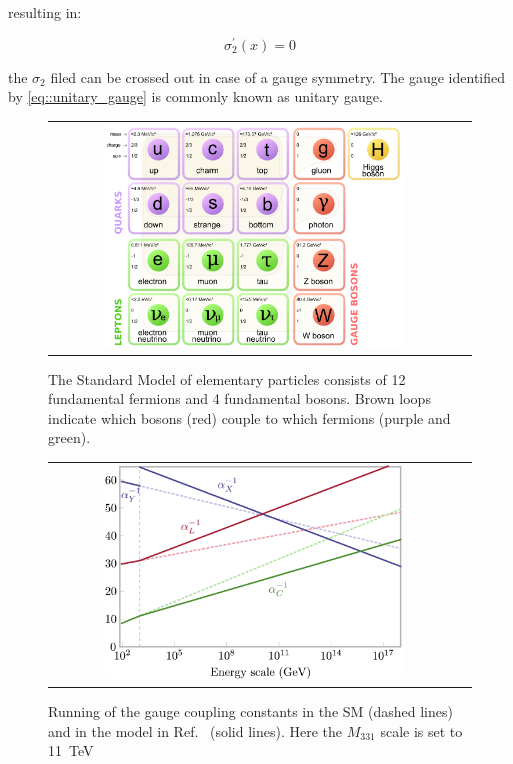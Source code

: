 resulting in:

\begin{equation}
\sigma^{\prime}_{2}(x) = 0
\label{eq::unitary_gauge}
\end{equation}

the $\sigma_{2}$ filed can be crossed out in case of a gauge symmetry. The gauge identified by \ref{eq::unitary_gauge} is commonly known as unitary gauge.

\begin{figure}[tbh!]
	\centering
	
	\begin{tabular}{cc}
		\includegraphics[width=0.75\textwidth]{theory/pics/SM_particles.png}
	\end{tabular}
	\caption{The Standard Model of elementary particles consists of  12 fundamental fermions and 4 fundamental bosons. Brown loops indicate which bosons (red) couple to which fermions (purple and green).}
	\label{fig:SM_particles}
\end{figure}

\begin{figure}[tbh!]
	\centering
	\begin{tabular}{cc}
		\includegraphics[width=0.75\textwidth]{theory/pics/gauge_unification.png}
	\end{tabular}
	\caption{Running of the gauge coupling constants in the SM (dashed lines) and in the model in Ref.~\cite{PhysRevD.90.013005} (solid lines). Here the $M_{331}$ scale is set to 11~TeV}
	\label{fig:gauge_unification}
\end{figure}

